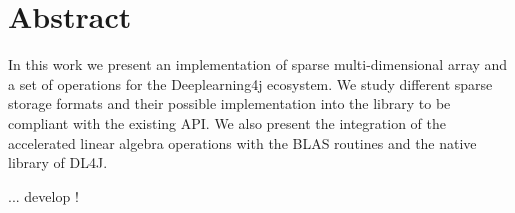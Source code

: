 

\cleardoublepage
\chapter*{Abstract}
In this work we present an implementation of sparse multi-dimensional array and a set of operations for the Deeplearning4j ecosystem. We study different sparse storage formats and their possible implementation into the library to be compliant with the existing API. We also present the integration of the accelerated linear algebra operations with the BLAS routines and the native library of DL4J.


... develop !

\vskip0.5cm




